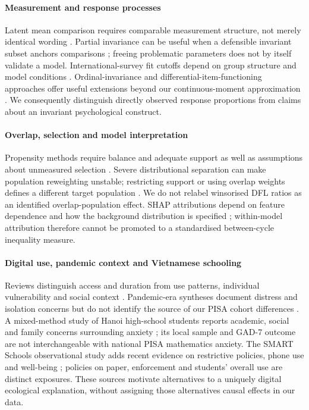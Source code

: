 \paragraph{Measurement and response processes} Latent mean comparison requires comparable measurement structure, not merely identical wording \citep{meredith1993,vandenberg2000}. Partial invariance can be useful when a defensible invariant subset anchors comparisons \citep{byrne1989}; freeing problematic parameters does not by itself validate a model. International-survey fit cutoffs depend on group structure and model conditions \citep{rutkowski2014,svetina2017}. Ordinal-invariance and differential-item-functioning approaches offer useful extensions beyond our continuous-moment approximation \citep{millsap2004,svetina2014}. We consequently distinguish directly observed response proportions from claims about an invariant psychological construct.

\paragraph{Overlap, selection and model interpretation} Propensity methods require balance and adequate support as well as assumptions about unmeasured selection \citep{stuart2010,austin2009,austin2015}. Severe distributional separation can make population reweighting unstable; restricting support or using overlap weights defines a different target population \citep{crump2009,li2018}. We do not relabel winsorised DFL ratios as an identified overlap-population effect. SHAP attributions depend on feature dependence and how the background distribution is specified \citep{aas2021,janzing2020}; within-model attribution therefore cannot be promoted to a standardised between-cycle inequality measure.

\paragraph{Digital use, pandemic context and Vietnamese schooling} Reviews distinguish access and duration from use patterns, individual vulnerability and social context \citep{dienlin2020,odgers2020review,odgers2020screen}. Pandemic-era syntheses document distress and isolation concerns but do not identify the source of our PISA cohort differences \citep{racine2021,loades2020,samji2022}. A mixed-method study of Hanoi high-school students reports academic, social and family concerns surrounding anxiety \citep{vietnam2024anxiety}; its local sample and GAD-7 outcome are not interchangeable with national PISA mathematics anxiety. The SMART Schools observational study adds recent evidence on restrictive policies, phone use and well-being \citep{goodyear2025}; policies on paper, enforcement and students' overall use are distinct exposures. These sources motivate alternatives to a uniquely digital ecological explanation, without assigning those alternatives causal effects in our data.

